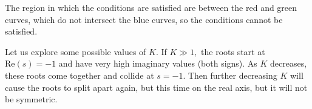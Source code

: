 \documentclass{article}
\numberwithin{equation}{section}
\begin{document}
\begin{enumerate}[label=\textbf{1.\arabic*}]
\begin{enumerate}[label=(\alph*)]
\begin{center}
        \end{center}
        The region in which the conditions are satisfied are between the red and green curves, which do not intersect the blue curves, so the conditions cannot be satisfied.
        \vspace{2mm}

        Let us explore some possible values of $K.$ If $K \gg 1,$ the roots start at $\text{Re}(s)=-1$ and have very high imaginary values (both signs). As $K$ decreases, these roots come together and collide at $s=-1.$ Then further decreasing $K$ will cause the roots to split apart again, but this time on the real axis, but it will not be symmetric.
        \vspace{2mm}


\end{enumerate}
\end{enumerate}
\end{document}
